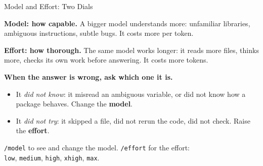 \documentclass[svgnames,x11names,dvipsnames]{beamer}
\begin{document}
\begin{frame}{Model and Effort: Two Dials}

\textbf{Model: how capable.} A bigger model understands more: unfamiliar libraries, ambiguous instructions, subtle bugs. It costs more per token.

\vspace{0.3cm}

\textbf{Effort: how thorough.} The same model works longer: it reads more files, thinks more, checks its own work before answering. It costs more tokens.

\vspace{0.5cm}

\textbf{When the answer is wrong, ask which one it is.}
\begin{itemize}
    \setlength{\itemsep}{4pt}
    \item It \emph{did not know}: it misread an ambiguous variable, or did not know how a package behaves. Change the \textbf{model}.
    \item It \emph{did not try}: it skipped a file, did not rerun the code, did not check. Raise the \textbf{effort}.
\end{itemize}

\vspace{0.4cm}

\centering
\texttt{/model} to see and change the model. \texttt{/effort} for the effort:\\
\texttt{low}, \texttt{medium}, \texttt{high}, \texttt{xhigh}, \texttt{max}.

\end{frame}
\end{document}
